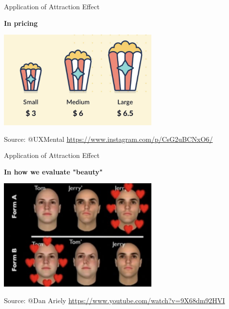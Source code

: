 \documentclass[
  ignorenonframetext,
  aspectratio=169]{beamer}
\begin{document}
\begin{frame}{Application of Attraction Effect}
\label{application-of-attraction-effect}
\begin{center}
  \textbf{In pricing}
\end{center}
\begin{center}
  \includegraphics[width=0.6\textwidth]{intro_pricing.png}
\end{center}

\vfill

\hfill \tiny Source: @UXMental
\url{https://www.instagram.com/p/CsG2uBCNxO6/}
\end{frame}

\begin{frame}{Application of Attraction Effect}
\label{application-of-attraction-effect-1}
\begin{center}
  \textbf{In how we evaluate "beauty"}
\end{center}
\begin{center}
  \includegraphics[width=0.6\textwidth]{intro_beauty.png}
\end{center}

\vfill

\hfill \tiny Source: @Dan Ariely
\url{https://www.youtube.com/watch?v=9X68dm92HVI}
\end{frame}
\end{document}
